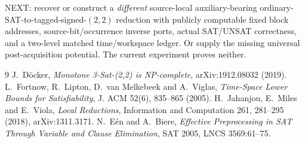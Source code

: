 \documentclass[11pt]{article}
\begin{document}
NEXT: recover or construct a \emph{different} source-local auxiliary-bearing ordinary-SAT-to-tagged-signed-$(2,2)$ reduction with publicly computable fixed block addresses, source-bit/occurrence inverse ports, actual SAT/UNSAT correctness, and a two-level matched time/workspace ledger. Or supply the missing universal post-acquisition potential. The current experiment proves neither.
\begin{thebibliography}{9}
 J.~D\"ocker, \emph{Monotone 3-Sat-(2,2) is NP-complete}, arXiv:1912.08032 (2019).
 L.~Fortnow, R.~Lipton, D.~van Melkebeek and A.~Viglas, \emph{Time-Space Lower Bounds for Satisfiability}, J. ACM 52(6), 835--865 (2005).
 H.~Jahanjou, E.~Miles and E.~Viola, \emph{Local Reductions}, Information and Computation 261, 281--295 (2018), arXiv:1311.3171.
 N.~E\'en and A.~Biere, \emph{Effective Preprocessing in SAT Through Variable and Clause Elimination}, SAT 2005, LNCS 3569:61--75.
\end{thebibliography}
\end{document}
